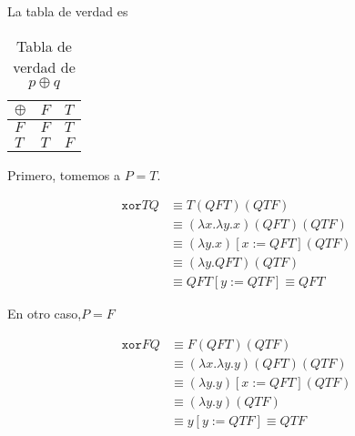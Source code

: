 \documentclass{article}
\begin{document}
\begin{enumerate}
{\begin{itemize}
{\begin{itemize}
{                            La tabla de verdad es 

                            \begin{table}[H]
                                \centering
                                \begin{tabular}{|l|l|l|}
                                    \hline
                                    $\oplus$ & $F$ & $T$ \\ \hline
                                    $F$      & $F$ & $T$ \\ \hline
                                    $T$      & $T$ & $F$ \\ \hline
                                \end{tabular}
                                \caption{Tabla de verdad de $p \oplus q$}
                                \label{tab:truth_xor}
                            \end{table}

                            Primero, tomemos a $P = T$.

                            \begin{align*}
                                \texttt{xor} T Q &\equiv T(QFT)(QTF) \\
                                &\equiv (\lambda x. \lambda y. x) (QFT)(QTF) \\
                                &\equiv (\lambda y. x)[x := QFT](QTF) \\
                                &\equiv (\lambda y. QFT)(QTF) \\
                                &\equiv QFT[y := QTF] \equiv QFT
                            \end{align*}

                            En otro caso,$P = F$

                            \begin{align*}
                                \texttt{xor} F Q &\equiv F(QFT)(QTF) \\
                                &\equiv (\lambda x. \lambda y. y) (QFT)(QTF) \\
                                &\equiv (\lambda y. y)[x := QFT](QTF) \\
                                &\equiv (\lambda y. y)(QTF) \\
                                &\equiv y[y := QTF] \equiv QTF
                            \end{align*}

}
\end{itemize}}
\end{itemize}}
\end{enumerate}
\end{document}
